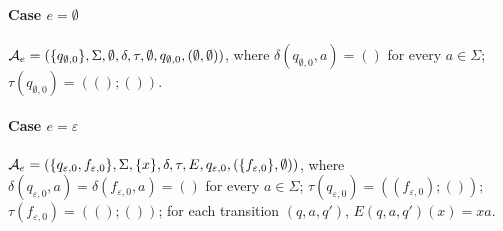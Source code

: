 %  








\paragraph{Case $e =\emptyset$} $\mathcal{A}_e = (\{q_{\emptyset, 0}\}, \Sigma, \emptyset, \delta, \tau, \emptyset, q_{\emptyset, 0}, (\emptyset, \emptyset))$, where $\delta(q_{\emptyset, 0}, a) = ()$ for every $a \in \Sigma$; $\tau(q_{\emptyset, 0}) = ((); ())$.
		

\paragraph{Case $e = \varepsilon$} $\mathcal{A}_e = (\{q_{\varepsilon, 0}, f_{\varepsilon,0}\}, \Sigma, \{x \}, \delta, \tau, E, q_{\varepsilon,0}, (\{f_{\varepsilon,0}\}, \emptyset))$, 
%
where $\delta(q_{\varepsilon,0}, a) = \delta(f_{\varepsilon,0}, a) = ()$ for every $a \in \Sigma$; $\tau(q_{\varepsilon,0}) = ((f_{\varepsilon,0}); ())$;  $\tau(f_{\varepsilon,0}) = ((); ())$; for each transition $(q, a, q')$, $E(q,a,q')(x) =xa$.
		
